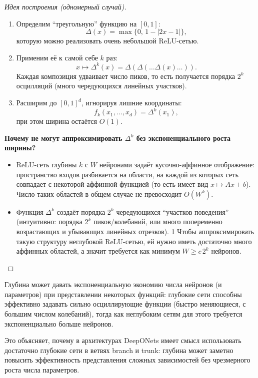 \documentclass[../NDCNNAI_main.tex]{subfiles}
\begin{document}
\begin{proof}[Идея построения (одномерный случай)]
\leavevmode
\begin{enumerate}
  \item Определим ``треугольную'' функцию на $[0,1]$:
  $$
  \Delta(x)=\max\{0,\, 1-|2x-1|\},
  $$
  которую можно реализовать очень небольшой ReLU-сетью.
  \item Применим её к самой себе $k$ раз:
  $$
  x \mapsto \Delta^{k}(x)=\Delta(\Delta(\ldots \Delta(x)\ldots)).
  $$
  Каждая композиция удваивает число пиков, то есть получается порядка $2^k$ осцилляций (много чередующихся линейных участков).
  \item Расширим до $[0,1]^d$, игнорируя лишние координаты:
  $$
  f_k(x_1,\ldots,x_d)=\Delta^{k}(x_1),
  $$
  при этом ширина остаётся $O(1)$.
\end{enumerate}
\textbf{Почему не могут аппроксимировать $\Delta^{k}$ без экспоненциального роста ширины?}
\begin{itemize}
  \item ReLU-сеть глубины $k$ с $W$ нейронами задаёт кусочно-аффинное отображение:
  пространство входов разбивается на области, на каждой из которых сеть совпадает с некоторой аффинной функцией
  (то есть имеет вид $x \mapsto Ax+b$).
  Число таких областей в общем случае не превосходит $O(W^k)$.
  \item Функция $\Delta^{k}$ создаёт порядка $2^k$ чередующихся ``участков поведения''
  (интуитивно: порядка $2^k$ пиков/колебаний, или много попеременно возрастающих и убывающих линейных отрезков).
1  Чтобы аппроксимировать такую структуру неглубокой ReLU-сетью, ей нужно иметь достаточно много аффинных областей,
  а значит требуется как минимум $W \ge c\,2^k$ нейронов.
\end{itemize}

\end{proof}

\begin{remark}
Глубина может давать экспоненциальную экономию числа нейронов (и параметров) при представлении некоторых функций:
глубокие сети способны эффективно задавать сильно осциллирующие функции (быстро меняющиеся, с большим числом колебаний),
тогда как неглубоким сетям для этого требуется экспоненциально больше нейронов.

Это объясняет, почему в архитектурах DeepONets имеет смысл использовать достаточно глубокие сети в ветвях branch и trunk:
глубина может заметно повысить эффективность представления сложных зависимостей без чрезмерного роста числа параметров.
\end{remark}
\end{document}

